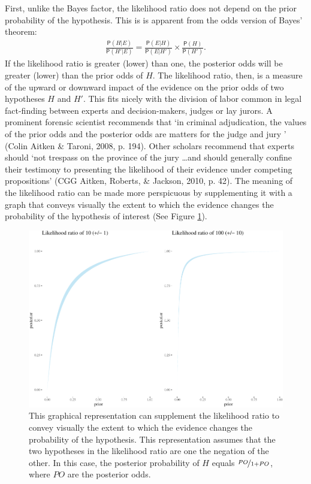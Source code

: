 \documentclass[
  10pt,
  dvipsnames,enabledeprecatedfontcommands]{scrartcl}
\newcommand{\pr}[1]{\mathsf{P}(#1)}
\begin{document}
First, unlike the Bayes factor, the likelihood ratio does not depend on
the prior probability of the hypothesis. This is is apparent from the
odds version of Bayes' theorem: \begin{align}\label{eq:BTodds}
\frac{\pr{H \vert E}}{\pr{H' \vert E}}= \frac{\pr{E \vert H}}{\pr{E \vert H'}}\times \frac{\pr{H}}{\pr{H'}}.
\end{align} \noindent If the likelihood ratio is greater (lower) than
one, the posterior odds will be greater (lower) than the prior odds of
\(H\). The likelihood ratio, then, is a measure of the upward or
downward impact of the evidence on the prior odds of two hypotheses
\(H\) and \(H'\). This fits nicely with the division of labor common in
legal fact-finding between experts and decision-makers, judges or lay
jurors. A prominent forensic scientist recommends that `in criminal
adjudication, the values of the prior odds and the posterior odds are
matters for the judge and jury ' (Colin Aitken \& Taroni, 2008, p. 194).
Other scholars recommend that experts should `not trespass on the
province of the jury \dots and should generally confine their testimony
to presenting the likelihood of their evidence under competing
propositions' (CGG Aitken, Roberts, \& Jackson, 2010, p. 42). The
meaning of the likelihood ratio can be made more perspicuous by
supplementing it with a graph that conveys visually the extent to which
the evidence changes the probability of the hypothesis of interest (See
Figure \ref{fig:effect-evidence}).

\begin{figure}[h]

\begin{center}\includegraphics[width=1\linewidth]{lr-chapter6_files/figure-latex/effect-evidence-b-1} \end{center}
\caption{This graphical representation can supplement the likelihood ratio to convey visually the extent to which the evidence changes the probability of the hypothesis. This representation assumes that the two hypotheses in the likelihood ratio are one the negation of the other. In this case, the posterior probability of $H$ equals $\nicefrac{PO}{1+PO}$, where $PO$ are the posterior odds.}
\label{fig:effect-evidence}
\end{figure}
\end{document}

